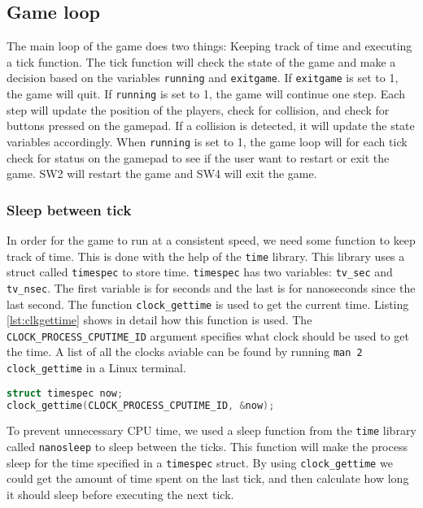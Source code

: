 \subsection{Game loop}
The main loop of the game does two things: Keeping track of time and executing a tick function. The tick function will check the state of the game and make a decision based on the variables \texttt{running} and \texttt{exitgame}. If \texttt{exitgame} is set to 1, the game will quit.  If \texttt{running} is set to 1, the game will continue one step. Each step will update the position of the players, check for collision, and check for buttons pressed on the gamepad. If a collision is detected, it will update the state variables accordingly. When \texttt{running} is set to 1, the game loop will for each tick check for status on the gamepad to see if the user want to restart or exit the game. SW2 will restart the game and SW4 will exit the game.

\subsubsection{Sleep between tick}
In order for the game to run at a consistent speed, we need some function to keep track of time. This is done with the help of the \texttt{time} library. This library uses a struct called \texttt{timespec} to store time. \texttt{timespec} has two variables: \texttt{tv\_sec} and \texttt{tv\_nsec}. The first variable is for seconds and the last is for nanoseconds since the last second. The function \texttt{clock\_gettime} is used to get the current time. Listing \ref{lst:clkgettime} shows in detail how this function is used. The \texttt{CLOCK\_PROCESS\_CPUTIME\_ID} argument specifies what clock should be used to get the time. A list of all the clocks aviable can be found by running \texttt{man 2 clock\_gettime} in a Linux terminal.

\begin{minipage}{\linewidth}
\begin{lstlisting}[language=c, label=lst:clkgettime, caption=How to get current time.]
struct timespec now;
clock_gettime(CLOCK_PROCESS_CPUTIME_ID, &now);
\end{lstlisting}
\end{minipage}

To prevent unnecessary CPU time, we used a sleep function from the \texttt{time} library called \texttt{nanosleep} to sleep between the ticks. This function will make the process sleep for the time specified in a \texttt{timespec} struct. By using \texttt{clock\_gettime} we could get the amount of time spent on the last tick, and then calculate how long it should sleep before executing the next tick. 

